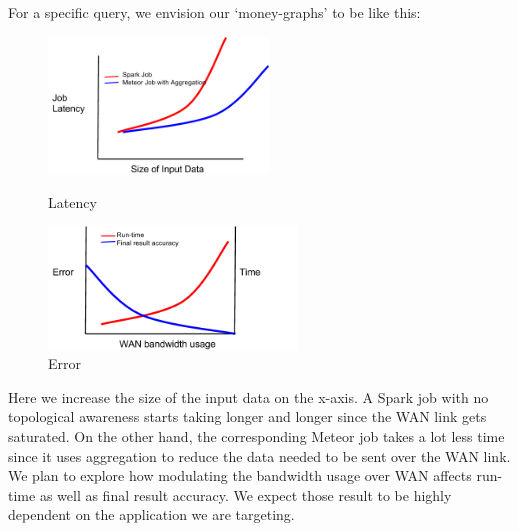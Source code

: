 For a specific query, we envision our ‘money-graphs’ to be like this:

\begin{figure}[ht]
	\centering
	\begin{minipage}[b]{0.45\linewidth}
		\includegraphics[width=2.3in]{figs/fig_1.png}
		\caption{Latency}
		\label{fig:minipage1}
	\end{minipage}
	\quad
	\begin{minipage}[b]{0.45\linewidth}
		\includegraphics[width=2.6in]{figs/fig_2.png}
		\caption{Error}
		\label{fig:minipage2}
	\end{minipage}
\end{figure}

Here we increase the size of the input data on the x-axis. A Spark job with no topological awareness starts taking longer and longer since the WAN link gets saturated. On the other hand, the corresponding Meteor job takes a lot less time since it uses aggregation to reduce the data needed to be sent over the WAN link. We plan to explore how modulating the bandwidth usage over WAN affects run-time as well as final result accuracy. We expect those result to be highly dependent on the application we are targeting.
